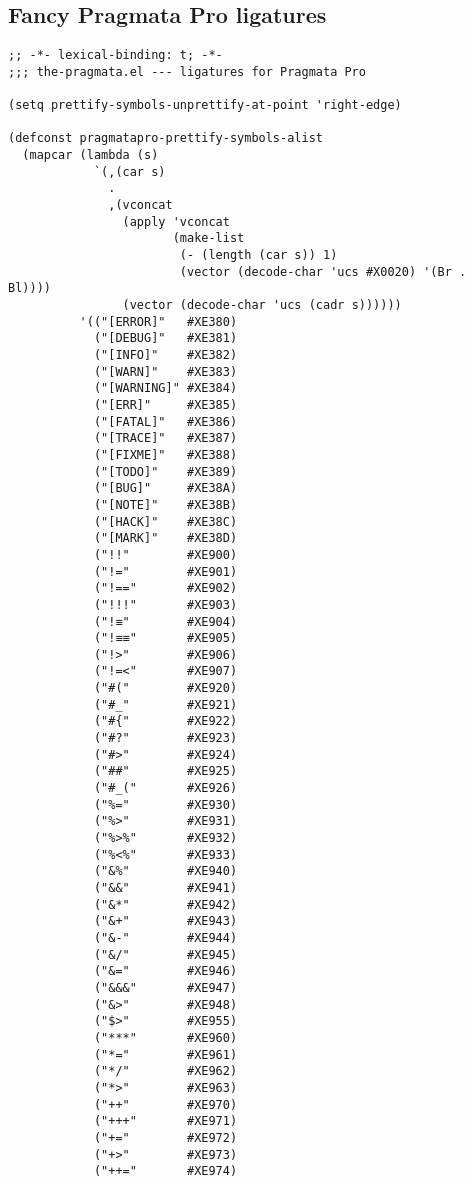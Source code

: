 \documentclass[11pt]{article}
\begin{document}
\subsection{Fancy Pragmata Pro ligatures}
\label{sec:org1fad614}
\begin{verbatim}
;; -*- lexical-binding: t; -*-
;;; the-pragmata.el --- ligatures for Pragmata Pro

(setq prettify-symbols-unprettify-at-point 'right-edge)

(defconst pragmatapro-prettify-symbols-alist
  (mapcar (lambda (s)
            `(,(car s)
              .
              ,(vconcat
                (apply 'vconcat
                       (make-list
                        (- (length (car s)) 1)
                        (vector (decode-char 'ucs #X0020) '(Br . Bl))))
                (vector (decode-char 'ucs (cadr s))))))
          '(("[ERROR]"   #XE380)
            ("[DEBUG]"   #XE381)
            ("[INFO]"    #XE382)
            ("[WARN]"    #XE383)
            ("[WARNING]" #XE384)
            ("[ERR]"     #XE385)
            ("[FATAL]"   #XE386)
            ("[TRACE]"   #XE387)
            ("[FIXME]"   #XE388)
            ("[TODO]"    #XE389)
            ("[BUG]"     #XE38A)
            ("[NOTE]"    #XE38B)
            ("[HACK]"    #XE38C)
            ("[MARK]"    #XE38D)
            ("!!"        #XE900)
            ("!="        #XE901)
            ("!=="       #XE902)
            ("!!!"       #XE903)
            ("!≡"        #XE904)
            ("!≡≡"       #XE905)
            ("!>"        #XE906)
            ("!=<"       #XE907)
            ("#("        #XE920)
            ("#_"        #XE921)
            ("#{"        #XE922)
            ("#?"        #XE923)
            ("#>"        #XE924)
            ("##"        #XE925)
            ("#_("       #XE926)
            ("%="        #XE930)
            ("%>"        #XE931)
            ("%>%"       #XE932)
            ("%<%"       #XE933)
            ("&%"        #XE940)
            ("&&"        #XE941)
            ("&*"        #XE942)
            ("&+"        #XE943)
            ("&-"        #XE944)
            ("&/"        #XE945)
            ("&="        #XE946)
            ("&&&"       #XE947)
            ("&>"        #XE948)
            ("$>"        #XE955)
            ("***"       #XE960)
            ("*="        #XE961)
            ("*/"        #XE962)
            ("*>"        #XE963)
            ("++"        #XE970)
            ("+++"       #XE971)
            ("+="        #XE972)
            ("+>"        #XE973)
            ("++="       #XE974)

\end{verbatim}
\end{document}
